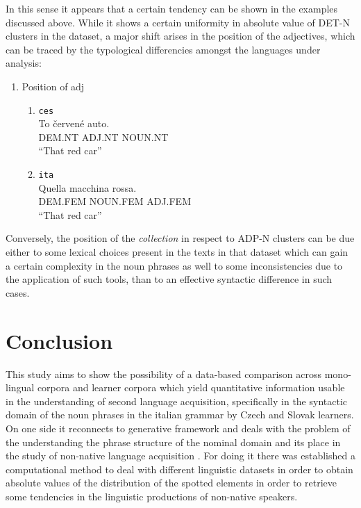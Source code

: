 \documentclass[a4paper,twoside,12pt,chapterprefix=false,listof=flat]{scrartcl}
\providecommand{\tightlist}{%
  \setlength{\itemsep}{0pt}\setlength{\parskip}{0pt}}
\theoremstyle{plain} %
\theoremstyle{definition}
\theoremstyle{remark}
\begin{document}
In this sense it appears that a certain tendency can be shown in the
examples discussed above. While it shows a certain uniformity in
absolute value of DET-N clusters in the dataset, a major shift arises in
the position of the adjectives, which can be traced by the typological
differencies amongst the languages under analysis:

\begin{enumerate}
\def\labelenumi{(\arabic{enumi})}
\setcounter{enumi}{3}
\tightlist
\item
  Position of adj

  \begin{enumerate}
  \def\labelenumii{\alph{enumii}.}
  \tightlist
  \item
    \texttt{ces} \label{exm:adjCes}\\
    \gll    To červené auto.\\
    DEM.NT ADJ.NT NOUN.NT\\
    \glt    \enquote{That red car}
  \item
    \texttt{ita} \label{exm:adjIta}\\
    \gll    Quella macchina rossa.\\
    DEM.FEM NOUN.FEM ADJ.FEM\\
    \glt    \enquote{That red car}
  \end{enumerate}
\end{enumerate}

Conversely, the position of the \emph{collection} in respect to ADP-N
clusters can be due either to some lexical choices present in the texts
in that dataset which can gain a certain complexity in the noun phrases
as well to some inconsistencies due to the application of such tools,
than to an effective syntactic difference in such cases.

\hypertarget{sec:concl}{%
\section{Conclusion}\label{sec:concl}}

This study aims to show the possibility of a data-based comparison
across mono-lingual corpora and learner corpora which yield quantitative
information usable in the understanding of second language acquisition,
specifically in the syntactic domain of the noun phrases in the italian
grammar by Czech and Slovak learners. On one side it reconnects to
generative framework and deals with the problem of the understanding the
phrase structure of the nominal domain \citep[\citet{bernstein2008},
\citet{zamparelli1995}]{abney1987} and its place in the study of
non-native language acquisition \citep{rothmanslabakova2017}. For doing
it there was established a computational method to deal with different
linguistic datasets \citep{sinclair2005} in order to obtain absolute
values of the distribution of the spotted elements in order to retrieve
some tendencies in the linguistic productions of non-native speakers.
\end{document}
